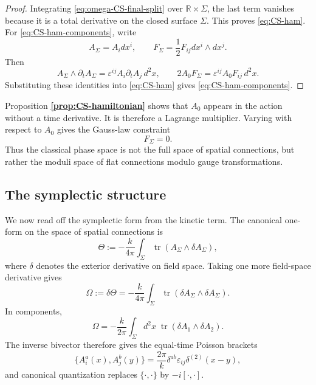 \documentclass[11pt]{article}
\newcommand{\R}{\mathbb{R}}
\newcommand{\tr}{\operatorname{tr}}
\theoremstyle{definition}
\numberwithin{theorem}{section}
\numberwithin{equation}{section}
\let\del\partial
\begin{document}
\begin{proof}
Integrating \eqref{eq:omega-CS-final-split} over $\R\times \Sigma$, the last term vanishes because it is a total derivative on the closed surface $\Sigma$. This proves \eqref{eq:CS-ham}. For \eqref{eq:CS-ham-components}, write
\begin{equation*}
A_\Sigma = A_i dx^i,
\qquad
F_\Sigma = \frac{1}{2}F_{ij}dx^i\wedge dx^j.
\end{equation*}
Then
\begin{equation*}
A_\Sigma\wedge \del_t A_\Sigma = \varepsilon^{ij}A_i\del_t A_j\, d^2x,
\qquad
2A_0F_\Sigma = \varepsilon^{ij}A_0F_{ij}\, d^2x.
\end{equation*}
Substituting these identities into \eqref{eq:CS-ham} gives \eqref{eq:CS-ham-components}.
\end{proof}

\medskip

\noindent Proposition \textbf{\ref{prop:CS-hamiltonian}} shows that $A_0$ appears in the action without a time derivative. It is therefore a Lagrange multiplier. Varying with respect to $A_0$ gives the Gauss-law constraint
\begin{equation}\label{eq:Gauss}
F_\Sigma = 0.
\end{equation}
Thus the classical phase space is not the full space of spatial connections, but rather the moduli space of flat connections modulo gauge transformations.

\subsection{The symplectic structure}

We now read off the symplectic form from the kinetic term. The canonical one-form on the space of spatial connections is
\begin{equation}\label{eq:canonical-one-form}
\Theta
:=
-\frac{k}{4\pi}\int_\Sigma \tr(A_\Sigma\wedge \delta A_\Sigma),
\end{equation}
where $\delta$ denotes the exterior derivative on field space. Taking one more field-space derivative gives
\begin{equation}\label{eq:symplectic}
\Omega
:=
\delta\Theta
=
-\frac{k}{4\pi}\int_\Sigma \tr(\delta A_\Sigma\wedge \delta A_\Sigma).
\end{equation}
In components,
\begin{equation*}
\Omega
=
-\frac{k}{2\pi}\int_\Sigma d^2x\; \tr(\delta A_1\wedge \delta A_2).
\end{equation*}
The inverse bivector therefore gives the equal-time Poisson brackets
\begin{equation}\label{eq:CS-commutators}
\{A_i^a(x),A_j^b(y)\}
=
\frac{2\pi}{k}\delta^{ab}\varepsilon_{ij}\delta^{(2)}(x-y),
\end{equation}
and canonical quantization replaces $\{\cdot,\cdot\}$ by $-i[\cdot,\cdot]$.
\end{document}
